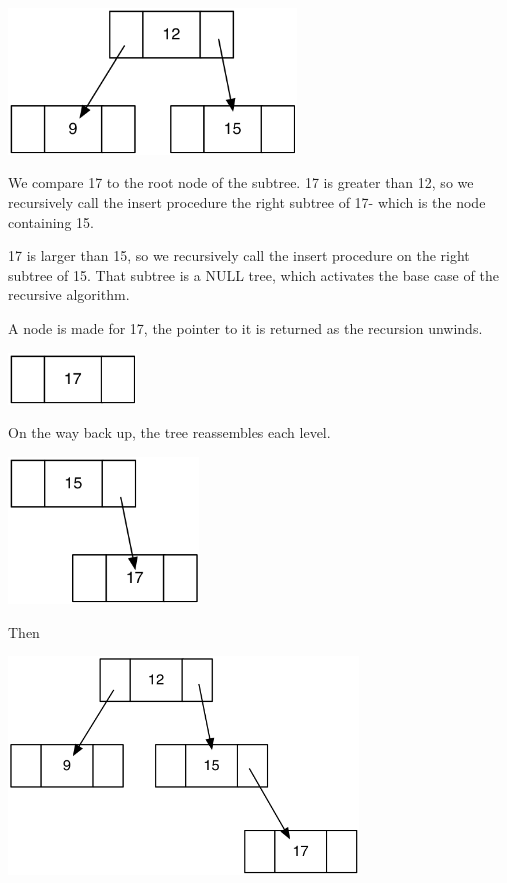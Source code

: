 \includegraphics[width=3.01389in]{pictures/bintree2.png}

We compare 17 to the root node of the subtree. 17 is greater than 12, so
we recursively call the insert procedure the right subtree of 17- which is the node containing 15.


17 is larger than 15, so we recursively call the insert procedure on the
right subtree of 15. That subtree is a NULL tree, which activates the
base case of the recursive algorithm.

A node is made for 17, the pointer to it is returned as the recursion
unwinds.

\includegraphics[width=1.34722in]{pictures/bintree3.png}

On the way back up, the tree reassembles each level.

\includegraphics[width=1.98611in]{pictures/bintree4.png}

Then

\includegraphics[width=3.65278in]{pictures/bintree5.png}

